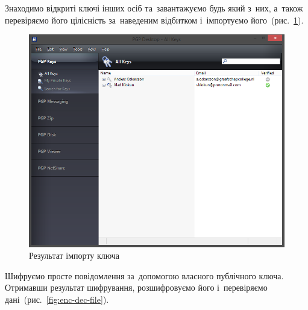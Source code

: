 \documentclass[
	a4paper,
	oneside,
	BCOR = 10mm,
	DIV = 12,
	12pt,
	headings = normal,
]{scrartcl}
\newlength{\gridunitwidth}
\begin{document}
		Знаходимо відкриті ключі інших осіб та~завантажуємо будь який з~них, а~також перевіряємо його цілісність за~наведеним відбитком і~імпортуємо його~(рис.~\ref{fig:pk-import}).

		\begin{figure}[!htbp]
			\centering
			\includegraphics[width = 6\gridunitwidth]{./assets/p08.png}
			\caption{Результат імпорту ключа}
			\label{fig:pk-import}
		\end{figure}

		Шифруємо просте повідомлення за~допомогою власного публічного ключа. Отримавши результат шифрування, розшифровуємо його і~перевіряємо дані~(рис.~\ref{fig:enc-dec-file}).
\end{document}
